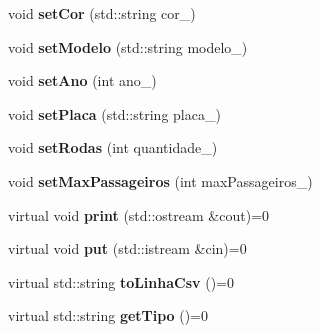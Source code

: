 \begin{DoxyCompactItemize}
void {\bfseries set\+Cor} (std\+::string cor\+\_\+)
\item 
\mbox{\label{classVeiculo_a6953ebfd78112862c796aebacaa27161}} 
void {\bfseries set\+Modelo} (std\+::string modelo\+\_\+)
\item 
\mbox{\label{classVeiculo_a0df3a2bcd3928fdd700e87e7e2cdcb11}} 
void {\bfseries set\+Ano} (int ano\+\_\+)
\item 
\mbox{\label{classVeiculo_a23a8b567c67416cb2ad4bdb2c3ae1bc6}} 
void {\bfseries set\+Placa} (std\+::string placa\+\_\+)
\item 
\mbox{\label{classVeiculo_a88c3aa2764f7570023176dccf2d25fb9}} 
void {\bfseries set\+Rodas} (int quantidade\+\_\+)
\item 
\mbox{\label{classVeiculo_abe3980edf5014bb70670b9cb33e034da}} 
void {\bfseries set\+Max\+Passageiros} (int max\+Passageiros\+\_\+)
\item 
\mbox{\label{classVeiculo_a62b111188e27e3e069e20e5969691208}} 
virtual void {\bfseries print} (std\+::ostream \&cout)=0
\item 
\mbox{\label{classVeiculo_a40d7362987d9b707f66898327f653ef3}} 
virtual void {\bfseries put} (std\+::istream \&cin)=0
\item 
\mbox{\label{classVeiculo_a31865955e0aa4bd7ad1df54849171803}} 
virtual std\+::string {\bfseries to\+Linha\+Csv} ()=0
\item 
\mbox{\label{classVeiculo_a2738ca690491aa2bc5f6ed609236e676}} 
virtual std\+::string {\bfseries get\+Tipo} ()=0
\end{DoxyCompactItemize}
